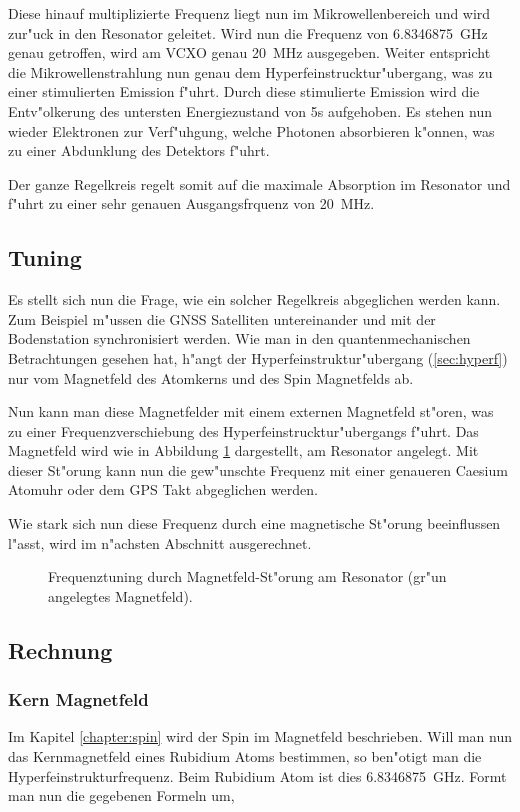 \begin{refsection}
Diese hinauf multiplizierte Frequenz liegt nun im Mikrowellenbereich
und wird zur"uck in den Resonator geleitet.  Wird nun die Frequenz von
\SI{6.8346875}{\giga\hertz} genau getroffen, wird am VCXO genau
\SI{20}{\mega\hertz} ausgegeben.  Weiter entspricht die
Mikrowellenstrahlung nun genau dem Hyperfeinstrucktur"ubergang, was zu
einer stimulierten Emission f"uhrt.  Durch diese stimulierte Emission
wird die Entv"olkerung des untersten Energiezustand von 5s aufgehoben.
Es stehen nun wieder Elektronen zur Verf"uhgung, welche Photonen
absorbieren k"onnen, was zu einer Abdunklung des Detektors f"uhrt.

Der ganze Regelkreis regelt somit auf die maximale Absorption im
Resonator und f"uhrt zu einer sehr genauen Ausgangsfrquenz von
\SI{20}{\mega\hertz}.

\subsection{Tuning}
Es stellt sich nun die Frage, wie ein solcher Regelkreis abgeglichen
werden kann.  Zum Beispiel m"ussen die GNSS Satelliten untereinander
und mit der Bodenstation synchronisiert werden.  Wie man in den
quantenmechanischen Betrachtungen gesehen hat, h"angt der
Hyperfeinstruktur"ubergang (\ref{sec:hyperf}) nur vom Magnetfeld des
Atomkerns und des Spin Magnetfelds ab.

Nun kann man diese Magnetfelder mit einem externen Magnetfeld st"oren,
was zu einer Frequenzverschiebung des Hyperfeinstrucktur"ubergangs
f"uhrt.  Das Magnetfeld wird wie in Abbildung \ref{fig:tuning}
dargestellt, am Resonator angelegt.  Mit dieser St"orung kann nun die
gew"unschte Frequenz mit einer genaueren Caesium Atomuhr oder dem GPS
Takt abgeglichen werden.

Wie stark sich nun diese Frequenz durch eine magnetische St"orung
beeinflussen l"asst, wird im n"achsten Abschnitt ausgerechnet.

\begin{figure}
  \centering
  
  \caption{Frequenztuning durch Magnetfeld-St"orung am Resonator
    (gr"un angelegtes Magnetfeld).}
  \label{fig:tuning}
\end{figure}

\subsection{Rechnung}

\subsubsection{Kern Magnetfeld}
Im Kapitel \ref{chapter:spin} wird der Spin im Magnetfeld beschrieben.
Will man nun das Kernmagnetfeld eines Rubidium Atoms bestimmen, so
ben"otigt man die Hyperfeinstrukturfrequenz.  Beim Rubidium Atom ist
dies \SI{6.8346875}{\giga\hertz}.  Formt man nun die gegebenen Formeln
um,


\end{refsection}
